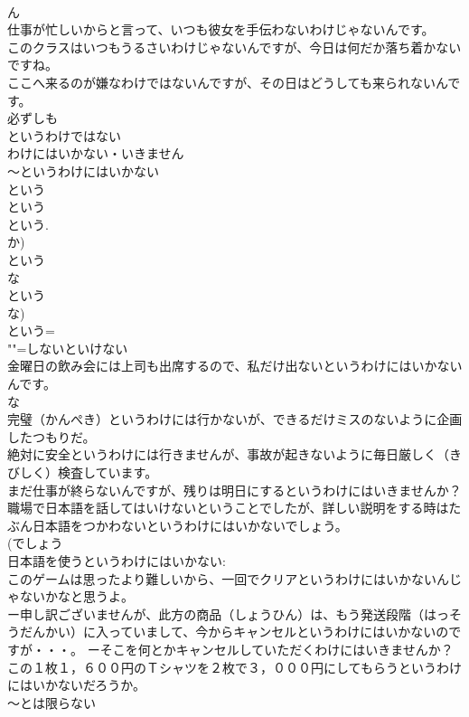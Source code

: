 \documentclass[8pt]{extreport}
\begin{document}
\begin{CJK}{UTF8}{min}
\\	ん 
\\	仕事が忙しいからと言って、いつも彼女を手伝わないわけじゃないんです。 
\\	このクラスはいつもうるさいわけじゃないんですが、今日は何だか落ち着かないですね。 
\\	ここへ来るのが嫌なわけではないんですが、その日はどうしても来られないんです。 
\\	必ずしも
\\	というわけではない 
\\	わけにはいかない・いきません 
\\	～というわけにはいかない 
\\	という 
\\	という 
\\	という. 
\\	か) 
\\	という 
\\	な
\\	という 
\\	な) 
\\	という= 
\\	""=しないといけない 
\\	金曜日の飲み会には上司も出席するので、私だけ出ないというわけにはいかないんです。 
\\	な
\\	完璧（かんぺき）というわけには行かないが、できるだけミスのないように企画したつもりだ。 
\\	絶対に安全というわけには行きませんが、事故が起きないように毎日厳しく（きびしく）検査しています。 
\\	まだ仕事が終らないんですが、残りは明日にするというわけにはいきませんか？ 
\\	職場で日本語を話してはいけないということでしたが、詳しい説明をする時はたぶん日本語をつかわないというわけにはいかないでしょう。 
\\	(でしょう 
\\	日本語を使うというわけにはいかない: 
\\	このゲームは思ったより難しいから、一回でクリアというわけにはいかないんじゃないかなと思うよ。 
\\	ー申し訳ございませんが、此方の商品（しょうひん）は、もう発送段階（はっそうだんかい）に入っていまして、今からキャンセルというわけにはいかないのですが・・・。 ーそこを何とかキャンセルしていただくわけにはいきませんか？ 
\\	この１枚１，６００円のＴシャツを２枚で３，０００円にしてもらうというわけにはいかないだろうか。 
\\	～とは限らない 

\end{CJK}
\end{document}
